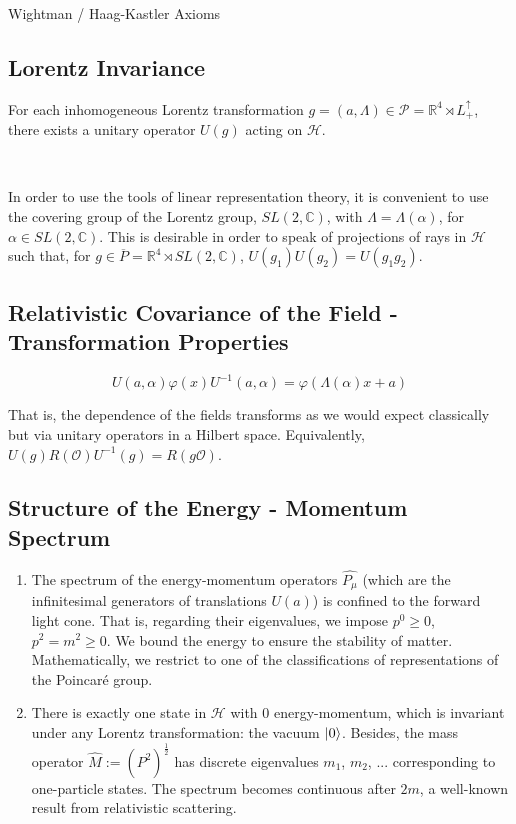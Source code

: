 \documentclass[12pt]{article}
\begin{document}
\begin{section}{Wightman / Haag-Kastler Axioms}
\begin{enumerate}
\end{enumerate} 

\subsection{Lorentz Invariance}

For each inhomogeneous Lorentz transformation $g=(a,\Lambda) \in \mathcal{P} = \mathbb{R}^4 \rtimes L^{\uparrow} _ {+}$, there exists a unitary operator $U(g)$ acting on $\mathcal{H}$.

\

In order to use the tools of linear representation theory, it is convenient to use the covering group of the Lorentz group, $SL(2,\mathbb{C})$, with $\Lambda = \Lambda (\alpha)$, for $\alpha \in SL(2,\mathbb{C})$. This is desirable in order to speak of projections of rays in $\mathcal{H}$ such that, for $g \in \overline{P} = \mathbb{R}^4 \rtimes SL(2,\mathbb{C})$, $U(g_1)U(g_2)=U(g_1 g_2)$.

\subsection{Relativistic Covariance of the Field - Transformation Properties}

\begin{equation}
U(a,\alpha) \varphi (x) U^{-1} (a,\alpha) = \varphi (\Lambda(\alpha)x + a)
\end{equation}

That is, the dependence of the fields transforms as we would expect classically but via unitary operators in a Hilbert space. Equivalently, $U(g)R(\mathcal{O})U^{-1}(g)=R(g\mathcal{O})$.

\subsection{Structure of the Energy - Momentum Spectrum}

\begin{enumerate}
\item The spectrum of the energy-momentum operators $\hat{P_{\mu}}$ (which are the infinitesimal generators of translations $U(a)$) is confined to the forward light cone. That is, regarding their eigenvalues, we impose $p^0 \geq 0$, $p^2 = m^2 \geq 0$. We bound the energy to ensure the stability of matter. Mathematically, we restrict to one of the classifications of representations of the Poincaré group.

\item There is exactly one state in $\mathcal{H}$ with $0$ energy-momentum, which is invariant under any Lorentz transformation: the vacuum $\ket{0}$. Besides, the mass operator $\hat{M}:=(\hat{P^2})^{\frac{1}{2}}$ has discrete eigenvalues $m_1$, $m_2$, ... corresponding to one-particle states. The spectrum becomes continuous after $2m$, a well-known result from relativistic scattering.
\end{enumerate}


\end{section}
\end{document}
